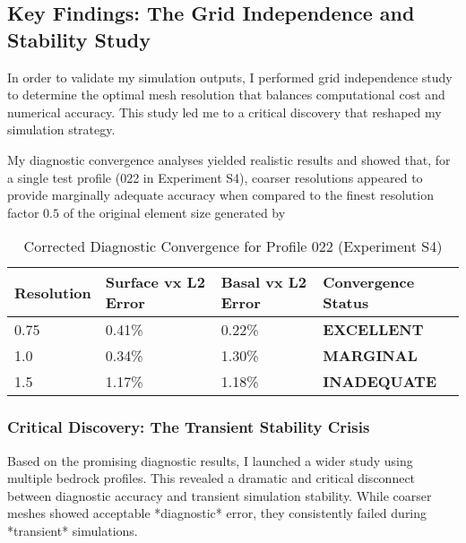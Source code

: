 \subsection{Key Findings: The Grid Independence and Stability Study}

In order to validate my simulation outputs, I performed grid independence study to determine the optimal mesh resolution that balances computational cost and numerical accuracy. This study led me to a critical discovery that reshaped my simulation strategy.

My diagnostic convergence analyses yielded realistic results and showed that, for a single test profile (022 in Experiment S4), coarser resolutions appeared to provide marginally adequate accuracy when compared to the finest resolution factor $0.5$ of the original element size generated by 

\begin{table}[h]
\centering
\caption{Corrected Diagnostic Convergence for Profile 022 (Experiment S4)}
\begin{tabular}{llll}
\toprule
Resolution & Surface vx L2 Error & Basal vx L2 Error & Convergence Status \\
\midrule
0.75 & 0.41\% & 0.22\% & \textbf{EXCELLENT} \\
1.0 & 0.34\% & 1.30\% & \textbf{MARGINAL} \\
1.5 & 1.17\% & 1.18\% & \textbf{INADEQUATE} \\
\bottomrule
\end{tabular}
\end{table}

\subsubsection{Critical Discovery: The Transient Stability Crisis}

Based on the promising diagnostic results, I launched a wider study using multiple bedrock profiles. This revealed a dramatic and critical disconnect between diagnostic accuracy and transient simulation stability. While coarser meshes showed acceptable *diagnostic* error, they consistently failed during *transient* simulations.

